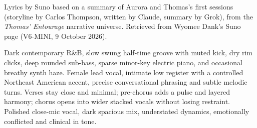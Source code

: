 
\begin{notes}
Lyrics by Suno based on a summary of Aurora and Thomas's first sessions (storyline by Carlos Thompson, written by Claude, summary by Grok), from the \emph{Thomas' Entourage} narrative universe. Retrieved from Wyomee Dank's Suno page (V6-MINI, 9 October 2026).
\end{notes}
\begin{style}
Dark contemporary R\&B, slow swung half-time groove with muted kick, dry rim clicks, deep rounded sub-bass, sparse minor-key electric piano, and occasional breathy synth haze. Female lead vocal, intimate low register with a controlled Northeast American accent, precise conversational phrasing and subtle melodic turns. Verses stay close and minimal; pre-chorus adds a pulse and layered harmony; chorus opens into wider stacked vocals without losing restraint. Polished close-mic vocal, dark spacious mix, understated dynamics, emotionally conflicted and clinical in tone.
\end{style}
